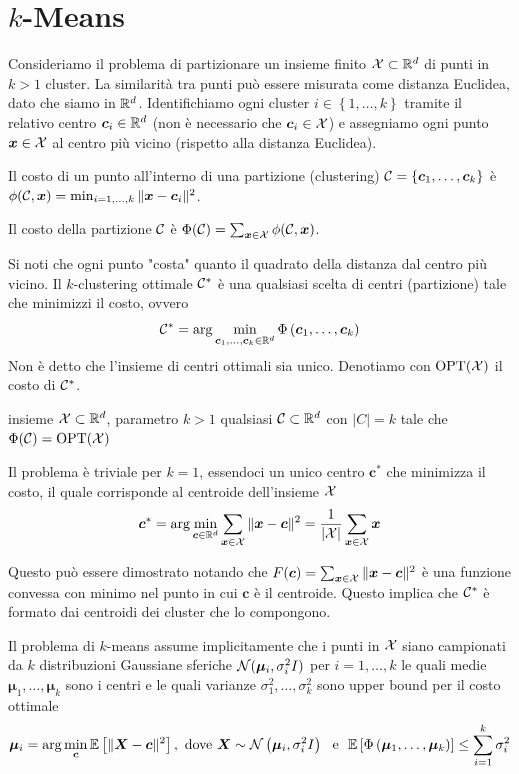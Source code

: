 \section{$k$-Means}
\label{prob: km}

Consideriamo il problema di partizionare un insieme finito $\mathcal{X} \subset \mathbb{R}^d$ di punti in $k > 1$ cluster. La similarità tra punti può essere misurata come distanza Euclidea, dato che siamo in $\mathbb{R}^d$. Identifichiamo ogni cluster $i \in \left\{1, \dots, k\right\}$ tramite il relativo centro $\bm c_i \in \mathbb{R}^d$ (non è necessario che $\bm c_i \in \mathcal{X}$) e assegniamo ogni punto $\bm x \in \mathcal{X}$ al centro più vicino (rispetto alla distanza Euclidea).

Il costo di un punto all'interno di una partizione (clustering) $\mathcal{C} = \left\{\bm c_1, \dots, \bm c_k\right\}$ è $\phi (\mathcal{C}, \bm x) = \min_{i = 1, \dots, k} \|\bm x - \bm c_i \|^2$.

Il costo della partizione $\mathcal{C}$ è $\Phi (\mathcal{C}) = \sum_{\bm x \in \mathcal{X}} \phi (\mathcal{C}, \bm x)$.

Si noti che ogni punto "costa" quanto il quadrato della distanza dal centro più vicino. Il $k$-clustering ottimale $\mathcal{C}^\ast$ è una qualsiasi scelta di centri (partizione) tale che minimizzi il costo, ovvero
$$ \mathcal{C}^\ast = \arg \min_{\bm c_1, \dots, \bm c_k \in \mathbb{R}^d} \Phi \left(\bm c_1,  \dots, \bm c_k\right) $$
Non è detto che l'insieme di centri ottimali sia unico. Denotiamo con $\textnormal{OPT}(\mathcal{X})$ il costo di $\mathcal{C}^\ast$.

{insieme $\mathcal{X} \subset \mathbb{R}^d$, parametro $k>1$}
{qualsiasi $\mathcal{C} \subset \mathbb{R}^d$ con $|C| = k$ tale che $\Phi(\mathcal{C}) = \textnormal{OPT}(\mathcal{X})$}

Il problema è triviale per $k=1$, essendoci un unico centro $\bm c^\ast$ che minimizza il costo, il quale corrisponde al centroide dell'insieme $\mathcal{X}$
$$ \bm c^\ast = \arg \min_{\bm c \in \mathbb{R}^d} \sum_{\bm x \in \mathcal{X}} \|\bm x - \bm c\|^2 = \frac{1}{|\mathcal{X}|} \sum_{\bm x \in \mathcal{X}} \bm x $$

Questo può essere dimostrato notando che $F(\bm c) = \sum_{\bm x \in \mathcal{X}} \|\bm x - \bm c\|^2$ è una funzione convessa con minimo nel punto in cui $\bm c$ è il centroide. Questo implica che $\mathcal{C}^\ast$ è formato dai centroidi dei cluster che lo compongono.

Il problema di $k$-means assume implicitamente che i punti in $\mathcal{X}$ siano campionati da $k$ distribuzioni Gaussiane sferiche $\mathcal{N} (\bm \mu_i, \sigma_i^2 I)$ per $i = 1, \dots, k$ le quali medie $\bm \mu_1, \dots, \bm \mu_k$ sono i centri e le quali varianze $\sigma_1^2, \dots, \sigma_k^2$ sono upper bound per il costo ottimale
$$ \bm \mu_i = \arg \min_{\bm c} \Ex \left[\|\bm X - \bm c\|^2 \right], \ \text{dove } \bm X \sim \Nc \left(\bm \mu_i, \sigma_i^2 I \right) \ \text{ e } \ \Ex \left[\Phi\left(\bm \mu_1, \dots, \bm \mu_k\right)\right] \leq \sum_{i = 1}^k \sigma_i^2 $$

